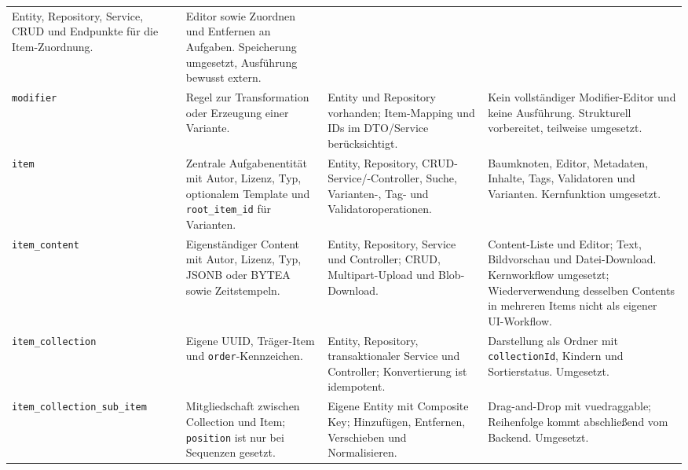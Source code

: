 ﻿\documentclass[11pt,a4paper]{article}
\begin{document}
\begin{longtable}{@{}p{.13\linewidth}p{.25\linewidth}p{.29\linewidth}p{.25\linewidth}@{}}
Entity, Repository, Service, CRUD und Endpunkte für die Item-Zuordnung.&
Editor sowie Zuordnen und Entfernen an Aufgaben. Speicherung umgesetzt,
Ausführung bewusst extern.\\
\texttt{modifier}&Regel zur Transformation oder Erzeugung einer Variante.&
Entity und Repository vorhanden; Item-Mapping und IDs im DTO/Service
berücksichtigt.&Kein vollständiger Modifier-Editor und keine Ausführung.
Strukturell vorbereitet, teilweise umgesetzt.\\
\texttt{item}&Zentrale Aufgabenentität mit Autor, Lizenz, Typ, optionalem
Template und \texttt{root\_item\_id} für Varianten.&Entity, Repository,
CRUD-Service/-Controller, Suche, Varianten-, Tag- und Validatoroperationen.&
Baumknoten, Editor, Metadaten, Inhalte, Tags, Validatoren und Varianten.
Kernfunktion umgesetzt.\\
\texttt{item\_\allowbreak content}&Eigenständiger Content mit Autor, Lizenz, Typ, JSONB
oder BYTEA sowie Zeitstempeln.&Entity, Repository, Service und Controller;
CRUD, Multipart-Upload und Blob-Download.&Content-Liste und Editor; Text,
Bildvorschau und Datei-Download. Kernworkflow umgesetzt; Wiederverwendung
desselben Contents in mehreren Items nicht als eigener UI-Workflow.\\
\texttt{item\_\allowbreak collection}&Eigene UUID, Träger-Item und
\texttt{order}-Kennzeichen.&Entity, Repository, transaktionaler Service und
Controller; Konvertierung ist idempotent.&Darstellung als Ordner mit
\texttt{collectionId}, Kindern und Sortierstatus. Umgesetzt.\\
\texttt{item\_\allowbreak collection\_\allowbreak sub\_\allowbreak item}&Mitgliedschaft zwischen Collection und
Item; \texttt{position} ist nur bei Sequenzen gesetzt.&Eigene Entity mit
Composite Key; Hinzufügen, Entfernen, Verschieben und Normalisieren.&
Drag-and-Drop mit vuedraggable; Reihenfolge kommt abschließend vom Backend.
Umgesetzt.\\
\bottomrule
\end{longtable}
\normalsize
\end{document}
